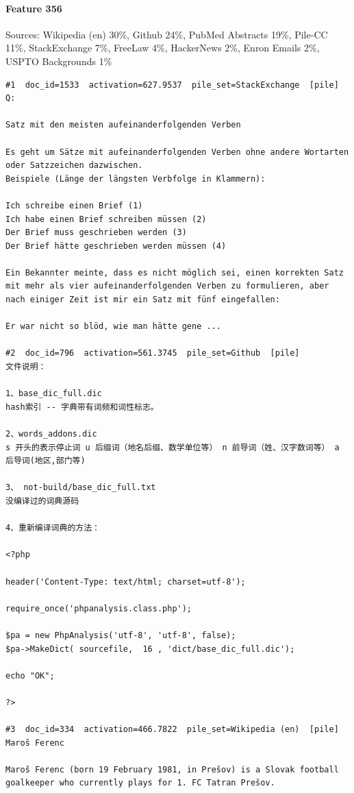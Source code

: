 \paragraph*{Feature 356} Sources: Wikipedia (en) 30\%, Github 24\%, PubMed Abstracts 19\%, Pile-CC 11\%, StackExchange 7\%, FreeLaw 4\%, HackerNews 2\%, Enron Emails 2\%, USPTO Backgrounds 1\%

\begin{verbatim}
#1  doc_id=1533  activation=627.9537  pile_set=StackExchange  [pile]
Q:

Satz mit den meisten aufeinanderfolgenden Verben

Es geht um Sätze mit aufeinanderfolgenden Verben ohne andere Wortarten oder Satzzeichen dazwischen.
Beispiele (Länge der längsten Verbfolge in Klammern):

Ich schreibe einen Brief (1)
Ich habe einen Brief schreiben müssen (2)
Der Brief muss geschrieben werden (3)
Der Brief hätte geschrieben werden müssen (4)

Ein Bekannter meinte, dass es nicht möglich sei, einen korrekten Satz mit mehr als vier aufeinanderfolgenden Verben zu formulieren, aber nach einiger Zeit ist mir ein Satz mit fünf eingefallen:

Er war nicht so blöd, wie man hätte gene ...

#2  doc_id=796  activation=561.3745  pile_set=Github  [pile]
﻿文件说明：

1、base_dic_full.dic
hash索引 -- 字典带有词频和词性标志。

2、words_addons.dic
s 开头的表示停止词 u 后缀词（地名后缀、数学单位等） n 前导词（姓、汉字数词等） a 后导词(地区,部门等)

3、 not-build/base_dic_full.txt
没编译过的词典源码

4、重新编译词典的方法：

<?php

header('Content-Type: text/html; charset=utf-8');

require_once('phpanalysis.class.php');

$pa = new PhpAnalysis('utf-8', 'utf-8', false);
$pa->MakeDict( sourcefile,  16 , 'dict/base_dic_full.dic');

echo "OK";

?>

#3  doc_id=334  activation=466.7822  pile_set=Wikipedia (en)  [pile]
Maroš Ferenc

Maroš Ferenc (born 19 February 1981, in Prešov) is a Slovak football goalkeeper who currently plays for 1. FC Tatran Prešov.


\end{verbatim}
